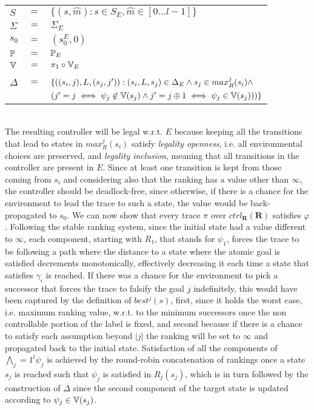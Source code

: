 \vspace{1em}
\begin{tabular}{ l c l }
	$S$ &$=$& $\{(s,\hat{m}) : s \in S_E, \hat{m} \in [0\ldots l-1] \}$\\
	$\Sigma$ &$=$&$\Sigma_E$\\	
	$s_0$&$=$&$(s_0^{E}, 0)$\\
	$\mathbb{P}$&$=$&$\mathbb{P}_E$\\	
	$\mathbb{V}$&$=$&$\pi_1 \circ \mathbb{V}_E$\\
	&&\\
	$\Delta$&$=$&$\{((s_i,j),L,(s_j,j')): (s_i,L,s_j) \in \Delta_E \wedge s_j \in max_{R}^j(s_i) \wedge$\\
	&&$(j' = j \iff \psi_j \not\in \mathbb{V}(s_j) \wedge j' = j \oplus 1 \iff \psi_j \in \mathbb{V}(s_j)))\}$\\
\end{tabular}
\vspace{1em}
\\
The resulting controller will be legal w.r.t. $E$ because keeping all the transitions that lead to states in $max_{R}^j(s_i)$ satisfy \emph{legality openness}, i.e. all environmental choices are preserved, and \emph{legality inclusion}, meaning that all transitions in the controller are present in $E$. Since at least one transition is kept from those coming from $s_i$ and considering also that the ranking has a value other than $\infty$, the controller should be deadlock-free, since otherwise, if there is a chance for the environment to lead the trace to such a state, the value would be back-propagated to $s_0$.
We can now show that every trace $\pi$ over $ctrl_{\mathbf{R}}(\mathbf{R})$ satisfies $\varphi$. Following the stable ranking system, since the initial state had a value different to $\infty$, each component, starting with $R_1$, that stands for $\psi_1$, forces the trace to be following a path where the distance to a state where the atomic goal is satisfied decrements monotonically, effectively decreasing it each time a state that satisfies $\gamma_i$ is reached. If there was a chance for the environment to pick a successor that forces the trace to falsify the goal $j$ indefinitely, this would have been captured by the definition of $best^j(s)$, first, since it holds the worst case, i.e. maximum ranking value, w.r.t. to the minimum successors once the non controllable portion of the label is fixed, and second because if there is a chance to satisfy each assumption beyond $|j|$ the ranking will be set to $\infty$ and propagated back to the initial state. Satisfaction of all the components of $\bigwedge_j=1^l \psi_j$ is achieved by the round-robin concatenation of rankings once a state $s_j$ is reached such that $\psi_j$ is satisfied in $R_j(s_j)$, which is in turn followed by the construction of $\Delta$ since the second component of the target state is updated according to $\psi_j \in \mathbb{V}(s_j)$.

